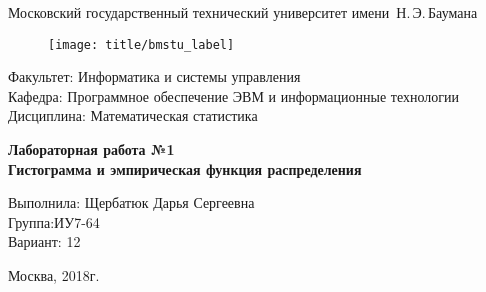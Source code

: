 
\thispagestyle{empty}

\begin{center}
    \Large
    Московский государственный технический университет имени~Н.\,Э.\,Баумана
\end{center}

\begin{figure}[h!]
    \begin{center}
        \texttt{[image: title/bmstu\_label]}
    \end{center}
\end{figure}

{\large
\noindent
Факультет: Информатика и системы управления\\[2mm]
\noindent
Кафедра: Программное обеспечение ЭВМ и информационные технологии\\[2mm]
\noindent
Дисциплина: Математическая статистика
\vspace{1.5cm}}

\begin{center}
    \Large
    \textbf{Лабораторная работа №1} \\
    \textbf{Гистограмма и эмпирическая функция распределения} \\
\end{center}
\vfill

\hfill\begin{minipage}{0.35\textwidth}
    Выполнила: Щербатюк Дарья Сергеевна\\
    Группа:ИУ7-64 \\
    Вариант: 12
\end{minipage}
\vfill

\begin{center}
    Москва, 2018г.
\end{center}